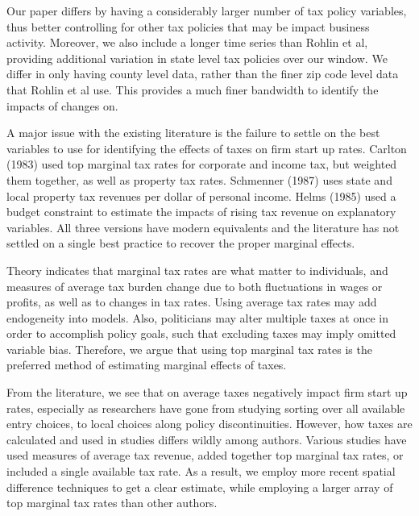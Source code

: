 Our paper differs by having a considerably larger number of tax policy variables, thus better controlling for other tax policies that may be impact business activity. Moreover, we also include a longer time series than Rohlin et al, providing additional variation in state level tax policies over our window. We differ in only having county level data, rather than the finer zip code level data that Rohlin et al use. This provides a much finer bandwidth to identify the impacts of changes on.

A major issue with the existing literature is the failure to settle on the best variables to use for identifying the effects of taxes on firm start up rates. Carlton (1983) used top marginal tax rates for corporate and income tax, but weighted them together, as well as property tax rates. Schmenner (1987) uses state and local property tax revenues per dollar of personal income. Helms (1985) used a budget constraint to estimate the impacts of rising tax revenue on explanatory variables. All three versions have modern equivalents and the literature has not settled on a single best practice to recover the proper marginal effects.

Theory indicates that marginal tax rates are what matter to individuals, and measures of average tax burden change due to both fluctuations in wages or profits, as well as to changes in tax rates. Using average tax rates may add endogeneity into models. Also, politicians may alter multiple taxes at once in order to accomplish policy goals, such that excluding taxes may imply omitted variable bias. Therefore, we argue that using top marginal tax rates is the preferred method of estimating marginal effects of taxes. 

From the literature, we see that on average taxes negatively impact firm start up rates, especially as researchers have gone from studying sorting over all available entry choices, to local choices along policy discontinuities. However, how taxes are calculated and used in studies differs wildly among authors. Various studies have used measures of average tax revenue, added together top marginal tax rates, or included a single available tax rate. As a result, we employ more recent spatial difference techniques to get a clear estimate, while employing a larger array of top marginal tax rates than other authors.